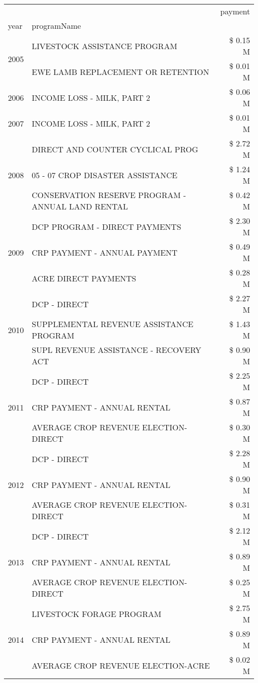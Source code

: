 \begin{tabular}{llr}
\toprule
 &  & payment \\
year & programName &  \\
\midrule
\multirow[t]{2}{*}{2005} & LIVESTOCK ASSISTANCE PROGRAM & \$ 0.15 M \\
 & EWE LAMB REPLACEMENT OR RETENTION & \$ 0.01 M \\
\cline{1-3}
2006 & INCOME LOSS - MILK, PART 2 & \$ 0.06 M \\
\cline{1-3}
2007 & INCOME LOSS - MILK, PART 2 & \$ 0.01 M \\
\cline{1-3}
\multirow[t]{3}{*}{2008} & DIRECT AND COUNTER CYCLICAL PROG & \$ 2.72 M \\
 & 05 - 07 CROP DISASTER ASSISTANCE & \$ 1.24 M \\
 & CONSERVATION RESERVE PROGRAM - ANNUAL LAND RENTAL & \$ 0.42 M \\
\cline{1-3}
\multirow[t]{3}{*}{2009} & DCP PROGRAM - DIRECT PAYMENTS & \$ 2.30 M \\
 & CRP PAYMENT - ANNUAL PAYMENT & \$ 0.49 M \\
 & ACRE DIRECT PAYMENTS & \$ 0.28 M \\
\cline{1-3}
\multirow[t]{3}{*}{2010} & DCP - DIRECT & \$ 2.27 M \\
 & SUPPLEMENTAL REVENUE ASSISTANCE PROGRAM & \$ 1.43 M \\
 & SUPL REVENUE ASSISTANCE - RECOVERY ACT & \$ 0.90 M \\
\cline{1-3}
\multirow[t]{3}{*}{2011} & DCP - DIRECT & \$ 2.25 M \\
 & CRP PAYMENT - ANNUAL RENTAL & \$ 0.87 M \\
 & AVERAGE CROP REVENUE ELECTION-DIRECT & \$ 0.30 M \\
\cline{1-3}
\multirow[t]{3}{*}{2012} & DCP - DIRECT & \$ 2.28 M \\
 & CRP PAYMENT - ANNUAL RENTAL & \$ 0.90 M \\
 & AVERAGE CROP REVENUE ELECTION-DIRECT & \$ 0.31 M \\
\cline{1-3}
\multirow[t]{3}{*}{2013} & DCP - DIRECT & \$ 2.12 M \\
 & CRP PAYMENT - ANNUAL RENTAL & \$ 0.89 M \\
 & AVERAGE CROP REVENUE ELECTION-DIRECT & \$ 0.25 M \\
\cline{1-3}
\multirow[t]{3}{*}{2014} & LIVESTOCK FORAGE PROGRAM & \$ 2.75 M \\
 & CRP PAYMENT - ANNUAL RENTAL & \$ 0.89 M \\
 & AVERAGE CROP REVENUE ELECTION-ACRE & \$ 0.02 M \\

\end{tabular}
